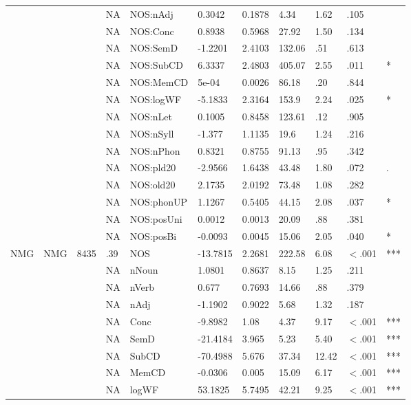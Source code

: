 \begin{table}[ht]
\begin{tabular}{lllllllllll}
   &  &  & NA & NOS:nAdj & 0.3042 & 0.1878 & 4.34 & 1.62 & .105 &   \\ 
   &  &  & NA & NOS:Conc & 0.8938 & 0.5968 & 27.92 & 1.50 & .134 &   \\ 
   &  &  & NA & NOS:SemD & -1.2201 & 2.4103 & 132.06 & .51 & .613 &   \\ 
   &  &  & NA & NOS:SubCD & 6.3337 & 2.4803 & 405.07 & 2.55 & .011 & * \\ 
   &  &  & NA & NOS:MemCD & 5e-04 & 0.0026 & 86.18 & .20 & .844 &   \\ 
   &  &  & NA & NOS:logWF & -5.1833 & 2.3164 & 153.9 & 2.24 & .025 & * \\ 
   &  &  & NA & NOS:nLet & 0.1005 & 0.8458 & 123.61 & .12 & .905 &   \\ 
   &  &  & NA & NOS:nSyll & -1.377 & 1.1135 & 19.6 & 1.24 & .216 &   \\ 
   &  &  & NA & NOS:nPhon & 0.8321 & 0.8755 & 91.13 & .95 & .342 &   \\ 
   &  &  & NA & NOS:pld20 & -2.9566 & 1.6438 & 43.48 & 1.80 & .072 & . \\ 
   &  &  & NA & NOS:old20 & 2.1735 & 2.0192 & 73.48 & 1.08 & .282 &   \\ 
   &  &  & NA & NOS:phonUP & 1.1267 & 0.5405 & 44.15 & 2.08 & .037 & * \\ 
   &  &  & NA & NOS:posUni & 0.0012 & 0.0013 & 20.09 & .88 & .381 &   \\ 
   &  &  & NA & NOS:posBi & -0.0093 & 0.0045 & 15.06 & 2.05 & .040 & * \\ 
  NMG & NMG & 8435 & .39 & NOS & -13.7815 & 2.2681 & 222.58 & 6.08 & $<$.001 & *** \\ 
   &  &  & NA & nNoun & 1.0801 & 0.8637 & 8.15 & 1.25 & .211 &   \\ 
   &  &  & NA & nVerb & 0.677 & 0.7693 & 14.66 & .88 & .379 &   \\ 
   &  &  & NA & nAdj & -1.1902 & 0.9022 & 5.68 & 1.32 & .187 &   \\ 
   &  &  & NA & Conc & -9.8982 & 1.08 & 4.37 & 9.17 & $<$.001 & *** \\ 
   &  &  & NA & SemD & -21.4184 & 3.965 & 5.23 & 5.40 & $<$.001 & *** \\ 
   &  &  & NA & SubCD & -70.4988 & 5.676 & 37.34 & 12.42 & $<$.001 & *** \\ 
   &  &  & NA & MemCD & -0.0306 & 0.005 & 15.09 & 6.17 & $<$.001 & *** \\ 
   &  &  & NA & logWF & 53.1825 & 5.7495 & 42.21 & 9.25 & $<$.001 & *** \\ 

\end{tabular}
\end{table}
